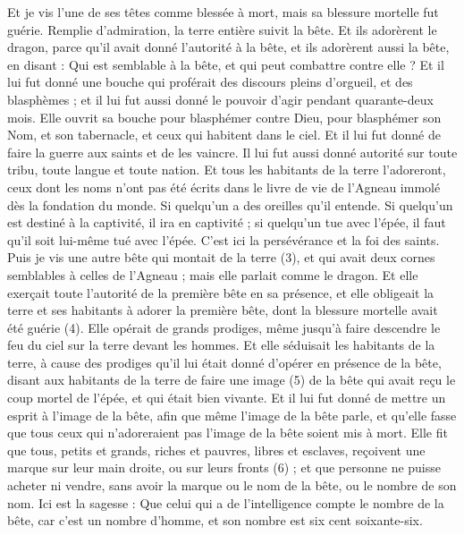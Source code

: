 \begin{multicols}{2}
Et je vis l'une de ses têtes comme blessée à mort, mais sa blessure mortelle fut guérie. Remplie d’admiration, la terre entière suivit la bête.
Et ils adorèrent le dragon, parce qu’il avait donné l’autorité à la bête, et ils adorèrent aussi la bête, en disant : Qui est semblable à la bête, et qui peut combattre contre elle ?
Et il lui fut donné une bouche qui proférait des discours pleins d’orgueil, et des blasphèmes ; et il lui fut aussi donné le pouvoir d’agir pendant quarante-deux mois.
Elle ouvrit sa bouche pour blasphémer contre Dieu, pour blasphémer son Nom, et son tabernacle, et ceux qui habitent dans le ciel.
Et il lui fut donné de faire la guerre aux saints et de les vaincre. Il lui fut aussi donné autorité sur toute tribu, toute langue et toute nation.
Et tous les habitants de la terre l’adoreront, ceux dont les noms n’ont pas été écrits dans le livre de vie de l'Agneau immolé dès la fondation du monde.
Si quelqu'un a des oreilles qu'il entende.
Si quelqu'un est destiné à la captivité, il ira en captivité ; si quelqu'un tue avec l'épée, il faut qu'il soit lui-même tué avec l'épée. C’est ici la persévérance et la foi des saints.
Puis je vis une autre bête qui montait de la terre (3), et qui avait deux cornes semblables à celles de l'Agneau ; mais elle parlait comme le dragon.
Et elle exerçait toute l’autorité de la première bête en sa présence, et elle obligeait la terre et ses habitants à adorer la première bête, dont la blessure mortelle avait été guérie (4).
Elle opérait de grands prodiges, même jusqu'à faire descendre le feu du ciel sur la terre devant les hommes.
Et elle séduisait les habitants de la terre, à cause des prodiges qu'il lui était donné d’opérer en présence de la bête, disant aux habitants de la terre de faire une image (5) de la bête qui avait reçu le coup mortel de l'épée, et qui était bien vivante.
Et il lui fut donné de mettre un esprit à l'image de la bête, afin que même l'image de la bête parle, et qu'elle fasse que tous ceux qui n’adoreraient pas l'image de la bête soient mis à mort.
Elle fit que tous, petits et grands, riches et pauvres, libres et esclaves, reçoivent une marque sur leur main droite, ou sur leurs fronts (6) ;
et que personne ne puisse acheter ni vendre, sans avoir la marque ou le nom de la bête, ou le nombre de son nom.
Ici est la sagesse : Que celui qui a de l'intelligence compte le nombre de la bête, car c'est un nombre d'homme, et son nombre est six cent soixante-six.

\end{multicols}
